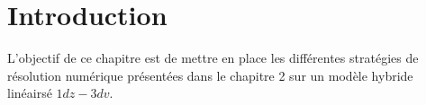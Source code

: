 
\section{Introduction}

L'objectif de ce chapitre est de mettre en place les différentes stratégies de résolution numérique présentées dans le chapitre 2 sur un modèle hybride linéairsé $1dz-3dv$.